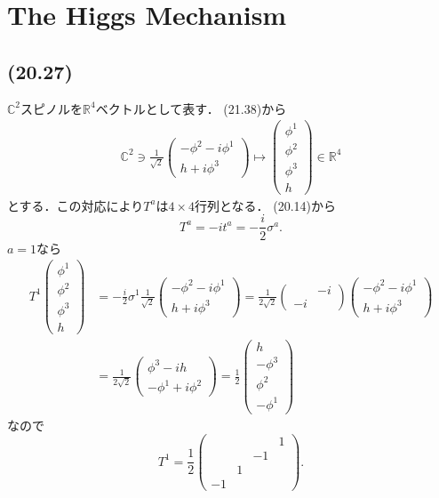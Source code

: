 \section{The Higgs Mechanism}
\subsection{(20.27)}
\(\mathbb{C}^2\)スピノルを\(\mathbb{R}^4\)ベクトルとして表す．
(21.38)から
\begin{align}
  \mathbb{C}^2 \ni
  \frac{1}{\sqrt{2}}
  \begin{pmatrix}
    -\phi^2 - i \phi^1 \\
    h + i\phi^3
  \end{pmatrix}
  \mapsto
  \begin{pmatrix}
    \phi^1 \\ \phi^2 \\ \phi^3 \\ h
  \end{pmatrix}
  \in \mathbb{R}^4
  \label{20_27_C2toR4}
\end{align}
とする．この対応により\(T^a\)は\(4\times4\)行列となる．
(20.14)から
\[ T^a = -i t^a = - \frac{i}{2} \sigma^a . \]
\(a=1\)なら
\begin{align*}
  T^1
  \begin{pmatrix}
    \phi^1 \\ \phi^2 \\ \phi^3 \\ h
  \end{pmatrix}
  &= - \frac{i}{2} \sigma^1
  \frac{1}{\sqrt{2}}
  \begin{pmatrix}
    -\phi^2 - i \phi^1 \\
    h + i\phi^3
  \end{pmatrix}
  = \frac{1}{2\sqrt{2}}
  \begin{pmatrix}
    & -i \\ -i &
  \end{pmatrix}
  \begin{pmatrix}
    -\phi^2 - i \phi^1 \\
    h + i\phi^3
  \end{pmatrix}
  \\
  &= \frac{1}{2\sqrt{2}}
  \begin{pmatrix}
    \phi^3 - ih \\
    -\phi^1 + i \phi^2
  \end{pmatrix}
  = \frac{1}{2}
  \begin{pmatrix}
    h \\ -\phi^3 \\ \phi^2 \\ -\phi^1
  \end{pmatrix}
\end{align*}
なので
\[
T^1 = \frac{1}{2}
\begin{pmatrix}
  & & & 1 \\ & & -1 & \\ & 1 & & \\ -1 & & &
\end{pmatrix}
.
\]

